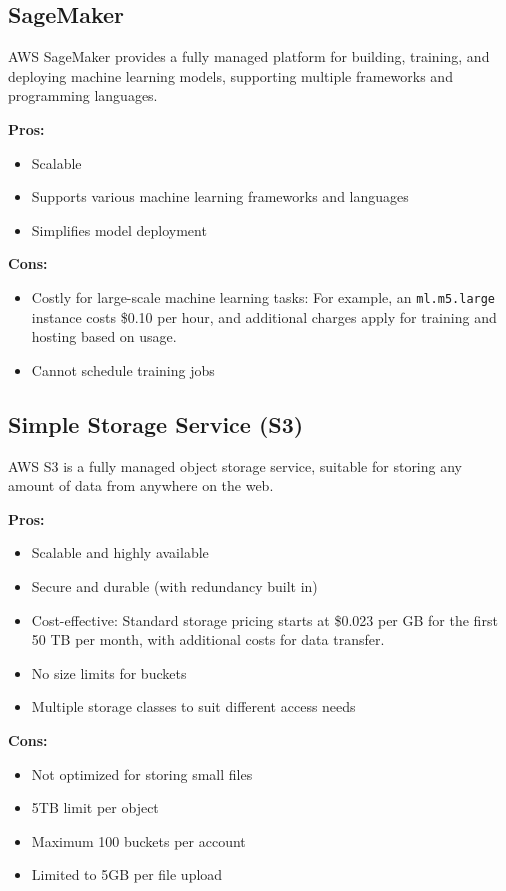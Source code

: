 \subsection*{SageMaker}
\label{aws:sage-maker}
AWS SageMaker provides a fully managed platform for building, training, and deploying machine learning models, supporting multiple frameworks and programming languages.

\textbf{Pros:}
\begin{itemize}
    \item Scalable
    \item Supports various machine learning frameworks and languages
    \item Simplifies model deployment
\end{itemize}

\textbf{Cons:}
\begin{itemize}
    \item Costly for large-scale machine learning tasks: For example, an \texttt{ml.m5.large} instance costs \$0.10 per hour, and additional charges apply for training and hosting based on usage.
    \item Cannot schedule training jobs
\end{itemize}

\subsection*{Simple Storage Service (S3)}
\label{aws:s3}
AWS S3 is a fully managed object storage service, suitable for storing any amount of data from anywhere on the web.

\textbf{Pros:}
\begin{itemize}
    \item Scalable and highly available
    \item Secure and durable (with redundancy built in)
    \item Cost-effective: Standard storage pricing starts at \$0.023 per GB for the first 50 TB per month, with additional costs for data transfer.
    \item No size limits for buckets
    \item Multiple storage classes to suit different access needs
\end{itemize}

\textbf{Cons:}
\begin{itemize}
    \item Not optimized for storing small files
    \item 5TB limit per object
    \item Maximum 100 buckets per account
    \item Limited to 5GB per file upload
\end{itemize}


